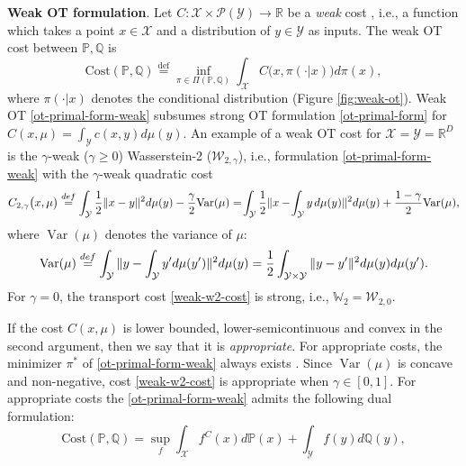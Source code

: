 \documentclass{article} %
\DeclareMathOperator{\Var}{Var}
\begin{document}
\vspace{-2mm}\textbf{Weak OT formulation}. Let ${C:\mathcal{X}\times\mathcal{P}(\mathcal{Y})\rightarrow\mathbb{R}}$ be a \textit{weak} cost \citep{gozlan2017kantorovich}, i.e., a function which takes a point $x\in\mathcal{X}$ and a distribution of $y\in\mathcal{Y}$  as inputs. The weak OT cost between $\mathbb{P},\mathbb{Q}$ is
\begin{equation}\text{Cost}(\mathbb{P},\mathbb{Q})\stackrel{\text{def}}{=}\inf_{\pi\in\Pi(\mathbb{P},\mathbb{Q})}\int_{\mathcal{X}}C\big(x,\pi(\cdot|x)\big)d\pi(x),
\label{ot-primal-form-weak}
\end{equation}
where $\pi(\cdot|x)$  denotes the conditional distribution (Figure \ref{fig:weak-ot}). Weak OT \eqref{ot-primal-form-weak} subsumes strong OT formulation \eqref{ot-primal-form} for $C(x,\mu)=\int_{\mathcal{Y}}c(x,y)d\mu(y)$. An example of a weak OT cost for $\mathcal{X}=\mathcal{Y}=\mathbb{R}^{D}$ is the $\gamma$-weak ($\gamma\!\geq\! 0$) Wasserstein-2 ($\mathcal{W}_{2,\gamma}$), i.e., formulation \eqref{ot-primal-form-weak} with the $\gamma$-weak quadratic cost \vspace{-1mm}
\begin{eqnarray}
    C_{2,\gamma}\big(x,\mu\big)\stackrel{def}{=}  \int_{\mathcal{Y}}\frac{1}{2}\|x-y\|^{2}d\mu(y)-\frac{\gamma}{2}\text{Var}(\mu)=\!
    \int_{\mathcal{Y}}\frac{1}{2}\|x-\!\int_{\mathcal{Y}}y\hspace{0.5mm}d\mu(y)\|^{2}d\mu(y)+\frac{1-\gamma}{2}\text{Var}(\mu),
    \label{weak-w2-cost}
\end{eqnarray}
where $\Var(\mu)$ denotes the variance of $\mu$:\vspace{-1.5mm}
\begin{equation}
    \Var(\mu)\stackrel{def}{=}\int_{\mathcal{Y}}\|y-\int_{\mathcal{Y}}y'd\mu(y')\|^{2}d\mu(y)=\frac{1}{2}\int_{\mathcal{Y}\times\mathcal{Y}}\|y-y'\|^{2}d\mu(y)d\mu(y').
    \label{var-def}
    \vspace{-1mm}
\end{equation}
\vspace{-1mm}For $\gamma=0$, the transport cost \eqref{weak-w2-cost} is strong, i.e., $\mathbb{W}_{2}=\mathcal{W}_{2,0}$.

If the cost $C(x,\mu)$ is lower bounded, lower-semicontinuous and convex in the second argument, then we say that it is \textit{appropriate}. For appropriate costs, the minimizer $\pi^{*}$ of \eqref{ot-primal-form-weak} always exists \citep[.1]{backhoff2019existence}. Since $\Var(\mu)$ is concave and non-negative, cost \eqref{weak-w2-cost} is appropriate when $\gamma\in [0,1]$. For appropriate costs the \eqref{ot-primal-form-weak} admits the following dual formulation:\vspace{-1.5mm}
\begin{equation}
    \text{Cost}(\mathbb{P},\mathbb{Q})=\sup_{f}\int_{\mathcal{X}} f^{C}(x)d\mathbb{P}(x)+\int_{\mathcal{Y}} f(y)d\mathbb{Q}(y),
    \label{ot-weak-dual}
\end{equation}
\end{document}
